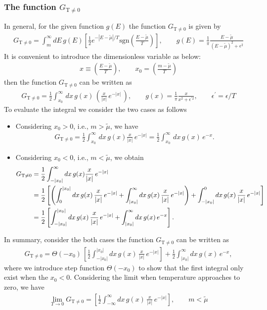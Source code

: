 \documentclass[sn-mathphys,Numbered]{sn-jnl}
\begin{document}
\subsubsection{The function $G_{\mathrm{T\neq0}}$}
In general, for the given function $g(E)$ the function $G_\mathrm{T\neq0}$ is given by
\begin{align}
G_{\mathrm{T\neq0}}=\int^\infty_m\!\!dE\, g(E)\left[\frac{1}{2}e^{ - |E-\widetilde\mu|/T }\mathrm{sgn}\left(\frac{E-\widetilde\mu}{T}\right)\right],\qquad g(E)=\frac{1}{\pi} \frac{E-\tilde\mu}{(E-\tilde\mu)^2+\epsilon^2}
\end{align}
It is convenient to introduce the dimensionless variable as below:
\begin{align}\label{x_dimensionless}
x\equiv\left(\frac{E-\tilde\mu}{T}\right), \qquad x_0=\left(\frac{m-\tilde\mu}{T}\right)
\end{align}
then the function $G_{\mathrm{T\neq0}}$ can be written as
\begin{align}
G_{\mathrm{T\neq0}}=\frac{1}{2}\int^\infty_{x_0}\,dx\,g(x)\,\left(\frac{x}{|x|}\,e^{-|x|}\,\right),\qquad g(x)=\frac{1}{\pi} \frac{x}{x^2+\epsilon^{\prime2}},\qquad \epsilon^\prime=\epsilon/T
\end{align}
To evaluate the integral we consider the two cases as follows
\begin{itemize}
  \item Considering $x_0>0$, i.e., $m>\tilde\mu$, we have
  \begin{align}
  G_{\mathrm{T\neq0}}=\frac{1}{2}\int^\infty_{x_0}\,dx\,g(x)\frac{x}{|x|}\,e^{-|x|}=\frac{1}{2}\int^{\infty}_{x_0}\,dx\,g(x)\,e^{-x}.
  \end{align}
  \item Considering $x_0<0$, i.e., $m<\tilde\mu$, we obtain
  \begin{align}
    G_{\mathrm{T\neq0}}&=\frac{1}{2}\int^\infty_{-|x_0|}dx\,g(x)\frac{x}{|x|}\,e^{-|x|}\\
    &=\frac{1}{2}\left[\left(\int_0^{|x_0|}dx\,g(x)\,\frac{x}{|x|}\,e^{-|x|}+\int^\infty_{|x_0|}dx\,g(x)\,\frac{x}{|x|}\,e^{-|x|}\right)+\int^0_{-|x_0|}dx\,g(x)\,\frac{x}{|x|}\,e^{-|x|}\right]\notag\\
   &=\frac{1}{2}\left[\int_{-|x_0|}^{|x_0|}dx\,g(x)\,\frac{x}{|x|}\,e^{-|x|}+\int^\infty_{|x_0|}dx\,g(x)\,e^{-x}\right].
  \end{align}
\end{itemize}
In summary, consider the both cases the function $G_\mathrm{T\neq0}$ can be written as
\begin{align}
  G_{\mathrm{T\neq0}}=\Theta(-x_0)\,\left[\frac{1}{2}\int_{-|x_0|}^{|x_0|}dx\,g(x)\,\frac{x}{|x|}\,e^{-|x|}\right]+\frac{1}{2}\int^\infty_{|x_0|}dx\,g(x)\,e^{-x},
\end{align}
where we introduce step function $\Theta(-x_0)$ to show that the first integral only exist when the $x_0<0$.
Considering the limit when temperature approaches to zero, we have
\begin{align}
\lim_{T\to0}G_{\mathrm{T\neq0}}=\left[\frac{1}{2}\int_{-\infty}^{\infty}dx\,g(x)\,\frac{x}{|x|}\,e^{-|x|}\right],\qquad m<\tilde\mu
\end{align}
\end{document}
